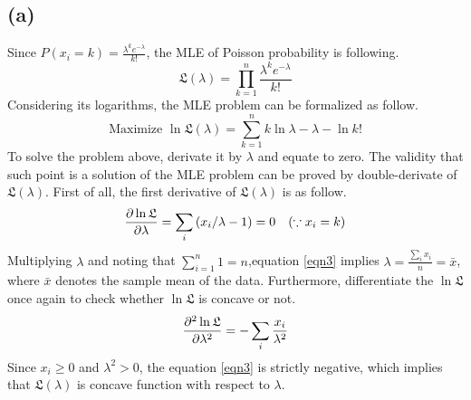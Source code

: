 \documentclass[10pt]{article}
\begin{document}
\subsection*{(a)}
Since $P(x_i=k) = \frac{\lambda^k e^{-\lambda}}{k!}$, the MLE of Poisson probability is following.
\begin{equation}
    \mathfrak{L}(\lambda) = \prod_{k=1}^n \frac{\lambda^k e^{-\lambda}}{k!}
\end{equation}
Considering its logarithms, the MLE problem can be formalized as follow.
\begin{equation}
    \text{Maximize } \ln\mathfrak{L}(\lambda) = \sum_{k=1}^n k\ln\lambda - \lambda -\ln k!
\end{equation}
To solve the problem above, derivate it by $\lambda$ and equate to zero. The validity that such point is a solution of the MLE problem can be proved by double-derivate of $\mathfrak{L}(\lambda)$.
First of all, the first derivative of $\mathfrak{L}(\lambda)$ is as follow.
\begin{equation}
    {\partial \ln \mathfrak{L} \over \partial \lambda} = \sum_i \left(x_i/\lambda - 1\right) = 0 \quad (\because x_i = k)
    \label{eqn3}
\end{equation}
Multiplying $\lambda$ and noting that $\sum_{i=1}^n 1 = n$,equation \ref{eqn3} implies $\lambda = \frac{\sum_i x_i}{n} = \bar{x}$, where $\bar{x}$ denotes the sample mean of the data.
Furthermore, differentiate the $\ln \mathfrak{L}$ once again to check whether $\ln \mathfrak{L}$ is concave or not. 
\begin{equation}
    {\partial^2 \ln \mathfrak{L} \over \partial \lambda^2} = - \sum_i \frac{x_i}{\lambda^2}
    \label{eqn4}
\end{equation}
Since $x_i \ge 0$ and $\lambda^2 > 0$, the equation \ref{eqn3} is strictly negative, which implies that $\mathfrak{L}(\lambda)$ is concave function with respect to $\lambda$.
\end{document}
